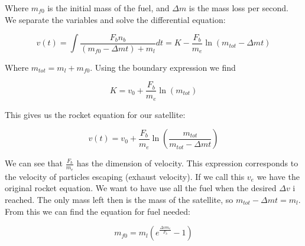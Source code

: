 \documentclass[a4paper, 10pt]{article}
\begin{document}
Where $m_{f0}$ is the initial mass of the fuel, and $\Delta m$ is the mass loss per second. We separate the variables and solve the differential equation:

\begin{equation}
v(t) = \int \frac{F_b n_b}{(m_{f0} - \Delta m t) + m_l} dt
= K - \frac{F_b}{m_e} \ln(m_{tot} - \Delta m t) 
\end{equation}

Where $m_{tot} = m_l + m_{f0}$. Using the boundary expression we find

\begin{equation}
K = v_0 + \frac{F_b}{m_e} \ln (m_{tot})
\end{equation}

This gives us the rocket equation for our satellite: 

\begin{equation}
v(t) =v_0 + \frac{F_b}{m_e} \ln \left(\frac{m_{tot}}{m_{tot} - \Delta m t} \right)
\end{equation}

We can see that $\frac{F_b}{m_e}$ has the dimension of velocity. This expression corresponds to the velocity of particles escaping (exhaust velocity). If we call this $v_e$ we have the original rocket equation. We want to have use all the fuel when the desired $\Delta v$ i reached. The only mass left then is the mass of the satellite, so $m_{tot} - \Delta m t = m_l$. From this we can find the equation for fuel needed:

\begin{equation}
m_{f0} = m_l(e^{\frac{\Delta v m_e}{F_b}} - 1)
\end{equation}



 

\end{document}
